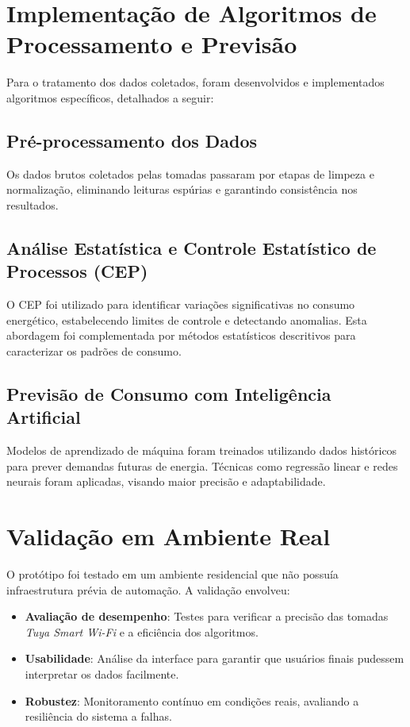 \section{Implementação de Algoritmos de Processamento e Previsão}

Para o tratamento dos dados coletados, foram desenvolvidos e implementados algoritmos específicos, detalhados a seguir:

\subsection{Pré-processamento dos Dados}

Os dados brutos coletados pelas tomadas passaram por etapas de limpeza e normalização, eliminando leituras espúrias e garantindo consistência nos resultados.

\subsection{Análise Estatística e Controle Estatístico de Processos (CEP)}

O CEP foi utilizado para identificar variações significativas no consumo energético, estabelecendo limites de controle e detectando anomalias. Esta abordagem foi complementada por métodos estatísticos descritivos para caracterizar os padrões de consumo.

\subsection{Previsão de Consumo com Inteligência Artificial}

Modelos de aprendizado de máquina foram treinados utilizando dados históricos para prever demandas futuras de energia. Técnicas como regressão linear e redes neurais foram aplicadas, visando maior precisão e adaptabilidade.

\section{Validação em Ambiente Real}

O protótipo foi testado em um ambiente residencial que não possuía infraestrutura prévia de automação. A validação envolveu:

\begin{itemize}
    \item \textbf{Avaliação de desempenho}: Testes para verificar a precisão das tomadas \textit{Tuya Smart Wi-Fi} e a eficiência dos algoritmos.
    \item \textbf{Usabilidade}: Análise da interface para garantir que usuários finais pudessem interpretar os dados facilmente.
    \item \textbf{Robustez}: Monitoramento contínuo em condições reais, avaliando a resiliência do sistema a falhas.
\end{itemize}


